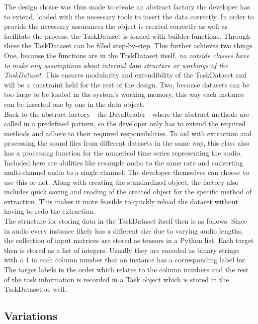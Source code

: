 The design choice was thus made to create an abstract factory the developer has to extend, loaded with the necessary tools to insert the data correctly. In order to provide the necessary assurances the object is created correctly as well as facilitate the process, the TaskDataset is loaded with builder functions. Through these the TaskDataset can be filled step-by-step. This further achieves two things. One, because the functions are in the TaskDataset itself, \textit{no outside classes have to make any assumptions about internal data structure or workings of the TaskDataset}. This ensures modularity and extendibility of the TaskDataset and will be a constraint held for the rest of the design. Two, because datasets can be too large to be loaded in the system's working memory, this way each instance can be inserted one by one in the data object. \\

Back to the abstract factory - the DataReader - where the abstract methods are called in a predefined pattern, so the developer only has to extend the required methods and adhere to their required responsibilities. To aid with extraction and processing the sound files from different datasets in the same way, this class also has a processing function for the numerical time series representing the audio. Included here are abilities like resample audio to the same rate and converting multi-channel audio to a single channel. The developer themselves can choose to use this or not. Along with creating the standardized object, the factory also includes quick saving and reading of the created object for the specific method of extraction. This makes it more feasible to quickly reload the dataset without having to redo the extraction. \\

The structure for storing data in the TaskDataset itself then is as follows. Since in audio every instance likely has a different size due to varying audio lengths, the collection of input matrices are stored as tensors in a Python list. Each target then is stored as a list of integers. Usually they are encoded as binary strings with a 1 in each column number that an instance has a corresponding label for. The target labels in the order which relates to the column numbers and the rest of the task information is recorded in a Task object which is stored in the TaskDataset as well. \\

\subsection{Variations}



